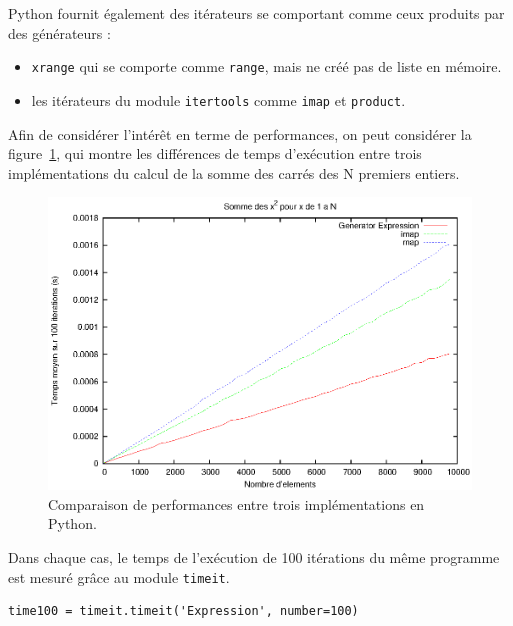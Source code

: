 \documentclass[a4paper]{article}
\begin{document}
Python fournit également des itérateurs se comportant comme ceux
produits par des générateurs :

\begin{itemize}
    \item \texttt{xrange} qui se comporte comme \texttt{range}, mais ne créé pas de liste en
  mémoire.
\item les itérateurs du module \texttt{itertools} comme \texttt{imap} et \texttt{product}.
\end{itemize}

Afin de considérer l'intérêt en terme de performances, on peut
considérer la figure~\ref{GenExpMapImapPy}, qui montre les différences
de temps d'exécution entre trois implémentations du calcul de la somme
des carrés des N premiers entiers.

\begin{figure}[h]
  \includegraphics[width=\textwidth]{./Pictures/GenExpMapImapPy}
  \caption{Comparaison de performances entre trois implémentations en Python.}
  \label{GenExpMapImapPy}
\end{figure}

Dans chaque cas, le temps de l'exécution de 100 itérations du même
programme est mesuré grâce au module \texttt{timeit}.

\begin{lstlisting}
time100 = timeit.timeit('Expression', number=100)
\end{lstlisting}
\end{document}
